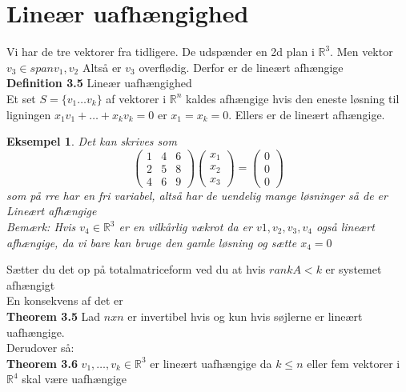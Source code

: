 \documentclass[a4paper,fleqn]{report}
\newcommand{\RR}{\mathbb{R}}
\newtheorem{example}{Eksempel}[chapter]
\begin{document}
	\section{Lineær uafhængighed}
	Vi har de tre vektorer fra tidligere. De udspænder en 2d plan i $\RR^3$. Men vektor
	$v_3 \in span v_1, v_2$ Altså er $v_3$ overflødig. Derfor er de lineært afhængige\\

	\textbf{Definition 3.5} Lineær uafhængighed\\
	Et set $S = \{ v_1\dots v_k \}$ af vektorer i $\RR^n$ kaldes afhængige hvis den eneste
	løsning til ligningen $x_1v_1 + \dots + x_kv_k = 0$ er $x_1 = x_k = 0$. Ellers er de
	lineært afhængige.
	\begin{example}
		Det kan skrives som 
		\[ \begin{pmatrix}1&4&6\\2&5&8\\4&6&9\end{pmatrix}\begin{pmatrix}x_1\\x_2\\x_3\end{pmatrix}
		= \begin{pmatrix}0\\0\\0\end{pmatrix}\] som på rre har en fri variabel, altså
		har de uendelig mange løsninger så de er \emph{Lineært afhængige}\\

		Bemærk: Hvis $v_4 \in \RR^3$ er en vilkårlig vækrot da er $v1, v_2, v_3, v_4$ også
		lineært afhængige, da vi bare kan bruge den gamle løsning og sætte $x_4 = 0$\\
	\end{example}

	Sætter du det op på totalmatriceform ved du at hvis $rank A < k$ er systemet afhængigt\\

	En konsekvens af det er\\
	\textbf{Theorem 3.5} Lad $n x n$ er invertibel hvis og kun hvis søjlerne er lineært
	uafhængige.\\

	Derudover så:\\
	\textbf{Theorem 3.6} $v_1, \dots, v_k \in \RR^3$ er lineært uafhængige da $k \leq n$ eller
	fem vektorer i $\RR^4$ skal være uafhængige\\
\end{document}
